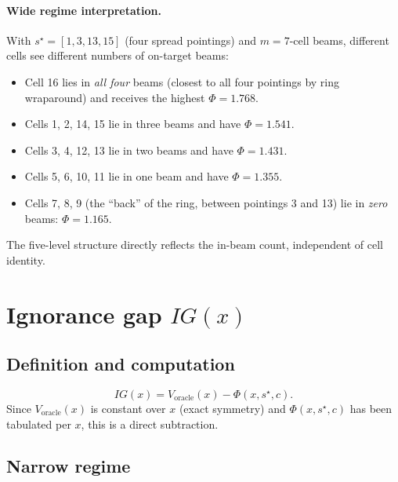 \documentclass[11pt,a4paper]{article}
\begin{document}
\paragraph{Wide regime interpretation.}  With $s^\star = [1, 3, 13, 15]$ (four spread pointings) and $m = 7$-cell beams, different cells see different numbers of on-target beams:
\begin{itemize}[nosep]
  \item Cell 16 lies in \emph{all four} beams (closest to all four pointings by ring wraparound) and receives the highest $\Phi = 1.768$.
  \item Cells 1, 2, 14, 15 lie in three beams and have $\Phi = 1.541$.
  \item Cells 3, 4, 12, 13 lie in two beams and have $\Phi = 1.431$.
  \item Cells 5, 6, 10, 11 lie in one beam and have $\Phi = 1.355$.
  \item Cells 7, 8, 9 (the ``back'' of the ring, between pointings 3 and 13) lie in \emph{zero} beams: $\Phi = 1.165$.
\end{itemize}
The five-level structure directly reflects the in-beam count, independent of cell identity.

\section{Ignorance gap $IG(x)$}

\subsection{Definition and computation}
\[
  IG(x) = V_{\text{oracle}}(x) - \Phi(x, s^\star, c).
\]
Since $V_{\text{oracle}}(x)$ is constant over $x$ (exact symmetry) and $\Phi(x, s^\star, c)$ has been tabulated per $x$, this is a direct subtraction.

\subsection{Narrow regime}
\end{document}
